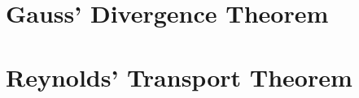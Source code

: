 




\section{Gauss' Divergence Theorem}
\label{gauss-divergence}

\section{Reynolds' Transport Theorem}
\label{reynolds-transport}

